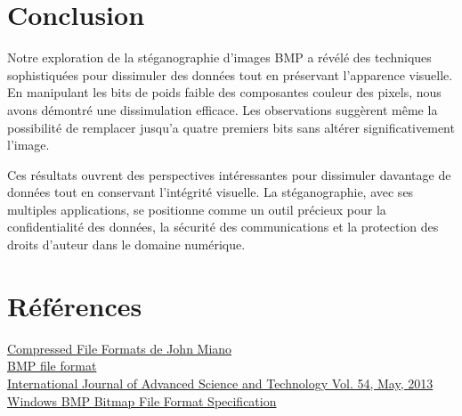 \documentclass{article}
\begin{document}
\section{Conclusion}
Notre exploration de la stéganographie d'images BMP a révélé des techniques sophistiquées pour dissimuler des données tout en préservant l'apparence visuelle. En manipulant les bits de poids faible des composantes couleur des pixels, nous avons démontré une dissimulation efficace. Les observations suggèrent même la possibilité de remplacer jusqu'a quatre premiers bits sans altérer significativement l'image.

Ces résultats ouvrent des perspectives intéressantes pour dissimuler davantage de données tout en conservant l'intégrité visuelle. La stéganographie, avec ses multiples applications, se positionne comme un outil précieux pour la confidentialité des données, la sécurité des communications et la protection des droits d'auteur dans le domaine numérique.

\section{Références}
\href{https://cdnpdf.com/embed/53951-compressed-image-file-formats-jpeg-png-gif-xbm-bmp-by-john-miano}{Compressed File Formats de John Miano}\\
\href{https://en.wikipedia.org/wiki/BMP_file_format}{BMP file format}\\
\href{https://www.researchgate.net/publication/271863505_A_Survey_of_Image_Steganography_Techniques}{International Journal of Advanced Science and Technology Vol. 54,  May, 2013 }\\
\href{https://cdn.hackaday.io/files/274271173436768/Simplified%20Windows%20BMP%20Bitmap%20File%20Format%20Specification.htm}{Windows BMP Bitmap File Format Specification}
\end{document}
